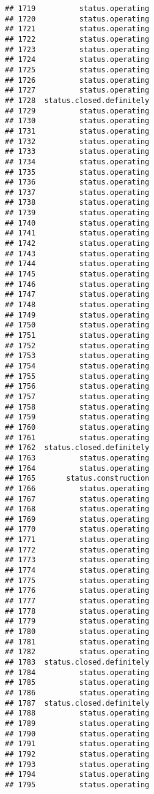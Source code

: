 \documentclass[
]{article}
\begin{document}
\begin{verbatim}
## 1719          status.operating
## 1720          status.operating
## 1721          status.operating
## 1722          status.operating
## 1723          status.operating
## 1724          status.operating
## 1725          status.operating
## 1726          status.operating
## 1727          status.operating
## 1728  status.closed.definitely
## 1729          status.operating
## 1730          status.operating
## 1731          status.operating
## 1732          status.operating
## 1733          status.operating
## 1734          status.operating
## 1735          status.operating
## 1736          status.operating
## 1737          status.operating
## 1738          status.operating
## 1739          status.operating
## 1740          status.operating
## 1741          status.operating
## 1742          status.operating
## 1743          status.operating
## 1744          status.operating
## 1745          status.operating
## 1746          status.operating
## 1747          status.operating
## 1748          status.operating
## 1749          status.operating
## 1750          status.operating
## 1751          status.operating
## 1752          status.operating
## 1753          status.operating
## 1754          status.operating
## 1755          status.operating
## 1756          status.operating
## 1757          status.operating
## 1758          status.operating
## 1759          status.operating
## 1760          status.operating
## 1761          status.operating
## 1762  status.closed.definitely
## 1763          status.operating
## 1764          status.operating
## 1765       status.construction
## 1766          status.operating
## 1767          status.operating
## 1768          status.operating
## 1769          status.operating
## 1770          status.operating
## 1771          status.operating
## 1772          status.operating
## 1773          status.operating
## 1774          status.operating
## 1775          status.operating
## 1776          status.operating
## 1777          status.operating
## 1778          status.operating
## 1779          status.operating
## 1780          status.operating
## 1781          status.operating
## 1782          status.operating
## 1783  status.closed.definitely
## 1784          status.operating
## 1785          status.operating
## 1786          status.operating
## 1787  status.closed.definitely
## 1788          status.operating
## 1789          status.operating
## 1790          status.operating
## 1791          status.operating
## 1792          status.operating
## 1793          status.operating
## 1794          status.operating
## 1795          status.operating

\end{verbatim}
\end{document}
